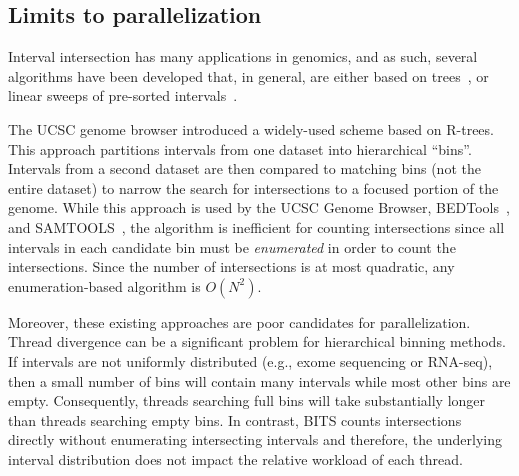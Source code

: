 \documentclass{bioinfo}
\begin{document}
% 
% 
% 


\subsection{Limits to parallelization}

Interval intersection has many applications in genomics, and as such, several
algorithms have been developed that, in general, are either based on
trees~\citep{kent2002,alekseyenko2007}, or linear sweeps of
pre-sorted intervals~\citep{richardson2006}.

The UCSC genome browser introduced a widely-used scheme based on
R-trees. This approach partitions intervals from one dataset into
hierarchical ``bins''.  Intervals from a second dataset are then compared 
to matching bins (not the entire dataset) to narrow the search
for intersections to a focused portion of the genome.  While this 
approach is used by the UCSC Genome Browser, BEDTools~\citep{quinlan2010},
and SAMTOOLS~\citep{li2009}, the algorithm is inefficient for counting 
intersections since all intervals in each candidate bin must be
\emph{enumerated} in order to count the intersections.  Since the number of
intersections is at most quadratic, any enumeration-based algorithm is
$O(N^2)$.
 
Moreover, these existing approaches are poor candidates for parallelization.
Thread divergence can be a significant problem for hierarchical binning methods.  
If intervals are not uniformly distributed
(e.g., exome sequencing or RNA-seq), then a small number of bins will contain
many intervals while most other bins are empty. 
Consequently, threads searching full
bins will take substantially longer than threads searching empty bins.  In
contrast, BITS counts intersections directly without enumerating
intersecting intervals and therefore, the underlying interval distribution does
not impact the relative workload of each thread.
\end{document}
